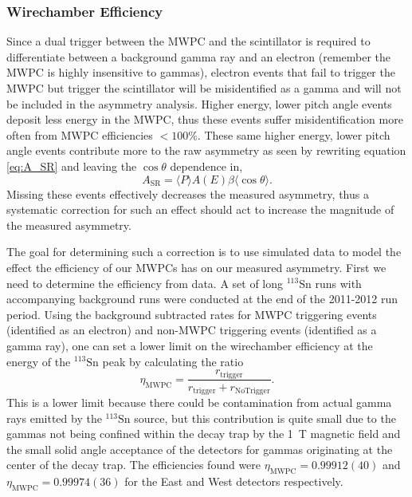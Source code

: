 \subsubsection{Wirechamber Efficiency}

Since a dual trigger between the MWPC and the scintillator is required to differentiate between
a background gamma ray and an electron (remember the MWPC is highly insensitive to gammas),
electron events that fail to
trigger the MWPC but trigger the scintillator will be misidentified as a gamma and will not
be included in the asymmetry analysis. Higher energy, lower pitch angle events deposit less
energy in the MWPC, thus these events suffer misidentification more often
from MWPC efficiencies $<100\%$. These same
higher energy, lower pitch angle events contribute more to the
raw asymmetry as seen by rewriting equation \ref{eq:A_SR}
and leaving the $\cos\theta$ dependence in,
%
\begin{equation}
  A_{\mathrm{SR}}=\langle P \rangle A(E) \beta \langle \cos\theta \rangle.
\end{equation}
%
\noindent Missing these events effectively decreases the measured asymmetry, thus a systematic
correction for such an effect
should act to increase the magnitude of the measured asymmetry.

The goal for determining such a correction is to use simulated data to model the effect
the efficiency of our MWPCs has on our measured asymmetry. First we need to determine
the efficiency from data. A set of long $^{113}\mathrm{Sn}$ runs with accompanying background runs
were conducted at the end of the 2011-2012 run period.
Using the background subtracted rates for MWPC triggering events (identified as an electron)
and non-MWPC triggering events (identified as a gamma ray), one can set
a lower limit on the wirechamber efficiency at the energy of the $^{113}\mathrm{Sn}$ peak
by calculating the ratio
%
\begin{equation}
  \eta_{\mathrm{MWPC}} = \frac{r_{\mathrm{trigger}}}{r_{\mathrm{trigger}}+r_{\mathrm{NoTrigger}}}.
\end{equation}
%
\noindent This is a lower limit because there could be contamination from actual gamma
rays emitted by the $^{113}\mathrm{Sn}$ source, but this contribution is quite small due
to the gammas not being confined within
the decay trap by the 1~T magnetic field and the small solid angle acceptance of the detectors
for gammas originating at the center of the decay trap. The efficiencies found were
$\eta_{\mathrm{MWPC}}=0.99912(40)$ and $\eta_{\mathrm{MWPC}}=0.99974(36)$ for the East and West
detectors respectively. 

